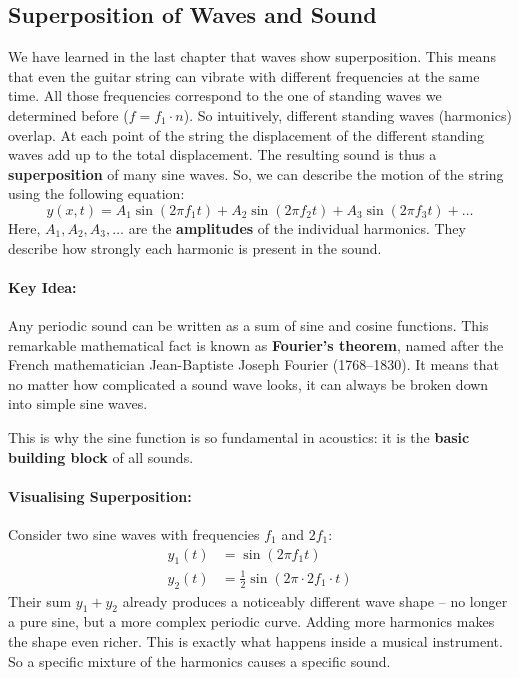 \subsection{Superposition of Waves and Sound}
We have learned in the last chapter that waves show superposition. This means that even the guitar string can vibrate with different frequencies at the same time. All those frequencies correspond to the one of standing waves we determined before ($f =f_1 \cdot n$). So intuitively, different standing waves (harmonics) overlap.  At each 
point of the string the displacement of the different standing waves add up to the total displacement. The resulting sound is thus a \textbf{superposition} of many sine waves. So, we can describe the motion of the string using the following equation: 
\begin{equation}
    y(x,t) = A_1 \sin(2\pi f_1 t) + A_2 \sin(2\pi f_2 t) + A_3 \sin(2\pi f_3 t) + \ldots
\end{equation}
Here, $A_1, A_2, A_3, \ldots$ are the \textbf{amplitudes} of the individual harmonics. 
They describe how strongly each harmonic is present in the sound.

\paragraph{Key Idea:}
Any periodic sound can be written as a sum of sine and cosine functions. 
This remarkable mathematical fact is known as \textbf{Fourier's theorem}, named after the 
French mathematician Jean-Baptiste Joseph Fourier (1768--1830). It means that no matter how 
complicated a sound wave looks, it can always be broken down into simple sine waves.

This is why the sine function is so fundamental in acoustics: it is the 
\textbf{basic building block} of all sounds.


\paragraph{Visualising Superposition:}
Consider two sine waves with frequencies $f_1$ and $2f_1$:
\begin{align}
    y_1(t) &= \sin(2\pi f_1 t) \\
    y_2(t) &= \frac{1}{2}\sin(2\pi \cdot 2f_1 \cdot t)
\end{align}
Their sum $y_1 + y_2$ already produces a noticeably different wave shape -- 
no longer a pure sine, but a more complex periodic curve. Adding more harmonics 
makes the shape even richer. This is exactly what happens inside a musical instrument. So a specific mixture of the harmonics causes a specific sound. 




